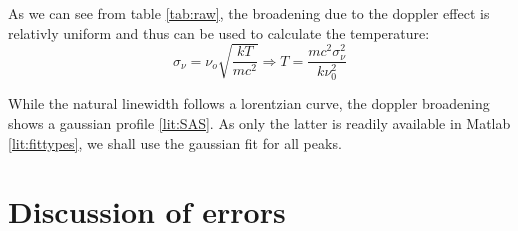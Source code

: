 As we can see from table \ref{tab:raw}, the broadening due to the doppler effect is relativly uniform and thus can be used to calculate the temperature:
\begin{equation}
 \sigma_\nu = \nu_o \sqrt{\frac{k T}{m c^2}} \Longrightarrow T = \frac{m c^2 \sigma_\nu^2}{k\nu_0^2}
\end{equation}






While the natural linewidth follows a lorentzian curve, the doppler broadening shows a gaussian profile \ref{lit:SAS}. As only the latter is readily available in Matlab \ref{lit:fittypes}, we shall use the gaussian fit for all peaks.








\section{Discussion of errors}
